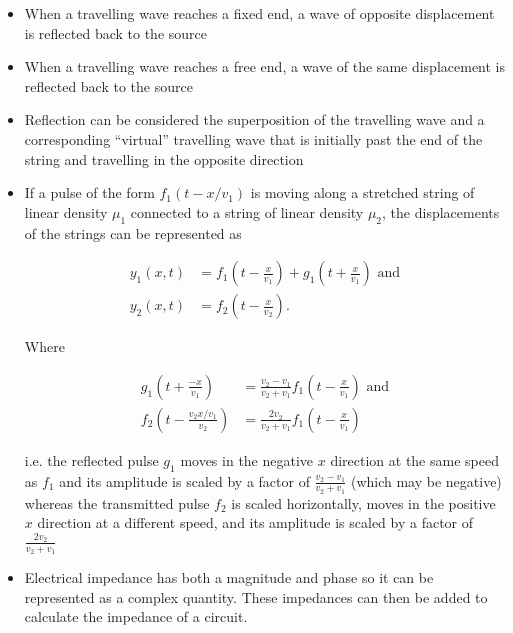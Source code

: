 \documentclass{article}
\begin{document}
\begin{itemize}
  \item When a travelling wave reaches a fixed end, a wave of opposite displacement is reflected back to the source

  \item When a travelling wave reaches a free end, a wave of the same displacement is reflected back to the source

  \item Reflection can be considered the superposition of the travelling wave and a corresponding ``virtual'' travelling wave that is initially past the end of the string and travelling in the opposite direction

  \item If a pulse of the form $f_1(t - x / v_1)$ is moving along a stretched string of linear density $\mu_1$ connected to a string of linear density $\mu_2$, the displacements of the strings can be represented as

        \begin{align*}
          y_1(x, t) & = f_1 \left( t - \frac{x}{v_1} \right) + g_1 \left( t + \frac{x}{v_1} \right) \text{ and} \\
          y_2(x, t) & = f_2 \left( t - \frac{x}{v_2} \right).
        \end{align*}

        Where

        \begin{align*}
          g_1 \left( t + \frac{-x}{v_1} \right)          & = \frac{v_2 - v_1}{v_2 + v_1} f_1 \left( t - \frac{x}{v_1} \right) \text{ and} \\
          f_2 \left( t - \frac{v_2 x / v_1}{v_2} \right) & = \frac{2 v_2}{v_2 + v_1} f_1 \left( t - \frac{x}{v_1} \right)
        \end{align*}

        i.e. the reflected pulse $g_1$ moves in the negative $x$ direction at the same speed as $f_1$ and its amplitude is scaled by a factor of $\frac{v_2 - v_1}{v_2 + v_1}$ (which may be negative) whereas the transmitted pulse $f_2$ is scaled horizontally, moves in the positive $x$ direction at a different speed, and its amplitude is scaled by a factor of $\frac{2 v_2}{v_2 + v_1}$

  \item Electrical impedance has both a magnitude and phase so it can be represented as a complex quantity. These impedances can then be added to calculate the impedance of a circuit.


\end{itemize}
\end{document}
